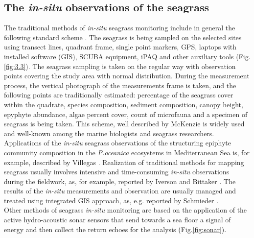 \documentclass[11pt]{article}
\begin{document}
\subsection[\textit{In-situ} observations of the seagrass]{The \textit{in-situ} observations of the seagrass}
The traditional methods of \textit{in-situ} seagrass monitoring include in general the following standard
scheme \cite{McKenzieetal03}\label{McKenzieetal03}. The seagrass is being sampled on the selected sites using transect lines,
quadrant frame, single point markers, \ac{GPS}, laptops with installed software (\ac{GIS}), \ac{SCUBA} equipment, \ac{iPAQ} and other auxiliary tools\label{page-15} (Fig.\ref{fig:3.3}). The seagrass sampling is taken on the regular way with observation points covering the study area with normal distribution.
During the measurement process, the vertical photograph of the measurements frame is taken, and the
following points are traditionally estimated: percentage of the seagrass cover within the quadrate,
species composition, sediment composition, canopy height, epyphyte abundance, algae percent cover,
count of microfauna and a specimen of seagrass is being taken. This scheme, well described by
McKenzie \cite{McKenzieetal03}\label{McKenzieetal03} is widely used and well-known among the marine biologists and
seagrass researchers. Applications of the \textit{in-situ} seagrass observations of the structuring epiphyte
community composition in the \textit{P.oceanica} ecosystems in Mediterranean Sea is, for example,
described by Villegas \cite{Villegas06}\label{Villegas06}. Realization of traditional methods for mapping seagrass usually
involves intensive and time-consuming \textit{in-situ} observations during the fieldwork, as, for example,
reported by Iverson and Bittaker \cite{Iverson86}\label{Iverson86}.  The results of the \textit{in-situ} measurements and observation are usually
managed and treated using integrated \ac{GIS} approach, as, e.g. reported by Schmieder \cite{Schmieder97}\label{Schmieder97}.\\
Other methods of seagrass \textit{in-situ} monitoring are based on the application of the active hydro-acoustic sonar sensors that send towards a sea floor a signal of energy and then collect the return echoes for the analysis (Fig.\ref{fig:sonar}). 
\end{document}
